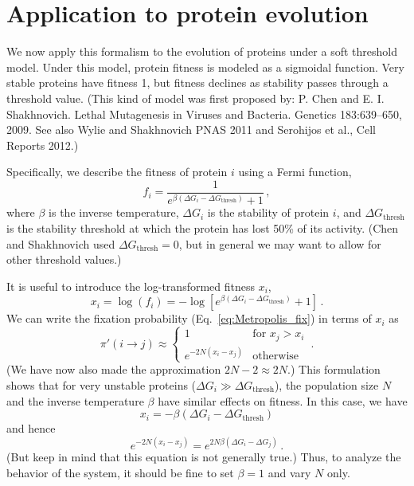 \documentclass[12pt]{article}
\begin{document}
\section{Application to protein evolution}

We now apply this formalism to the evolution of proteins under a soft threshold model. Under this model, protein fitness is modeled as a sigmoidal function. Very stable proteins have fitness 1, but fitness declines as stability passes through a threshold value. (This kind of model was first proposed by: P. Chen and E. I. Shakhnovich. Lethal Mutagenesis in Viruses and Bacteria. Genetics 183:639--650, 2009. See also Wylie and Shakhnovich PNAS 2011 and Serohijos et al., Cell Reports 2012.)

Specifically, we describe the fitness of protein $i$ using a Fermi function,
\begin{equation}
   f_i = \frac{1}{e^{\beta(\Delta G_i-\Delta G_\text{thresh})} + 1} \,,
\end{equation}
where $\beta$ is the inverse temperature, $\Delta G_i$ is the stability of protein $i$, and $\Delta G_\text{thresh}$ is the stability threshold at which the protein has lost 50\% of its activity. (Chen and Shakhnovich used $\Delta G_\text{thresh}=0$, but in general we may want to allow for other threshold values.)

It is useful to introduce the log-transformed fitness $x_i$,
\begin{equation}
  x_i = \log(f_i) = -\log[e^{\beta(\Delta G_i-\Delta G_\text{thresh})} + 1]\,.
\end{equation}
We can write the fixation probability (Eq.~\ref{eq:Metropolis_fix}) in terms of $x_i$ as
\begin{equation}
  \pi'(i\rightarrow j)
      \approx \begin{cases}
        1 & \text{for $x_j>x_i$} \\
        e^{-2N(x_i-x_j)} & \text{otherwise}
      \end{cases}\,.
\end{equation}
(We have now also made the approximation $2N-2\approx 2N$.) This formulation shows that for very unstable proteins ($\Delta G_i\gg\Delta G_\text{thresh}$), the population size $N$ and the inverse temperature $\beta$ have similar effects on fitness. In this case, we have 
\begin{equation}
  x_i = - \beta(\Delta G_i-\Delta G_\text{thresh})
\end{equation}
and hence
\begin{equation}
 e^{-2N(x_i-x_j)} = e^{2N\beta (\Delta G_i - \Delta G_j)}\,. 
\end{equation}
(But keep in mind that this equation is not generally true.) Thus, to analyze the behavior of the system, it should be fine to set $\beta=1$ and vary $N$ only.
\end{document}
